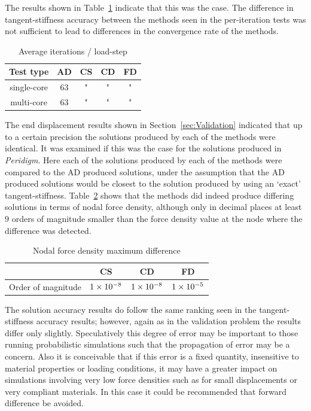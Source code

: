 \documentclass[preprint,12pt]{elsarticle}
\begin{document}
The results shown in Table~\ref{tab:ConvergenceStudy2} indicate that this was the case.  The difference in tangent-stiffness accuracy between the methods seen in the per-iteration tests was not sufficient to lead to differences in the convergence rate of the methods.
%
\begin{table}[htb]   
    \centering 
    \caption{Average iterations / load-step} 
    \label{tab:ConvergenceStudy2}   
    \begin{tabular}{c c c c c}
        \toprule 
        Test type & AD & CS & CD & FD\\
        \midrule 
        single-core & 63 & " & " & "\\ 
        multi-core  & 63 & " & " & "\\ 
        \bottomrule 
    \end{tabular} 
\end{table}

The end displacement results shown in Section~\ref{sec:Validation} indicated that up to a certain precision the solutions produced by each of the methods were identical. It was examined if this was the case for the solutions produced in \emph{Peridigm}. Here each of the solutions produced by each of the methods were compared to the AD produced solutions, under the assumption that the AD produced solutions would be closest to the solution produced by using an `exact' tangent-stiffness. Table~\ref{tab:PeridigmSolutionAccuracy} shows that the methods did indeed produce differing solutions in terms of nodal force density, although only in decimal places at least $9$ orders of magnitude smaller than the force density value at the node where the difference was detected.
%
\begin{table}[hbp]   
    \centering 
    \caption{Nodal force density maximum difference} 
    \label{tab:PeridigmSolutionAccuracy}   
    \begin{tabular}{c c c c}
        \toprule  & CS & CD & FD\\
        \midrule  Order of magnitude & $\num{1.E-8}$ & $\num{1.E-8}$ & $\num{1.E-5}$ \\ 
        \bottomrule 
    \end{tabular} 
\end{table}

The solution accuracy results do follow the same ranking seen in the tangent-stiffness accuracy results; however, again as in the validation problem the results differ only slightly. Speculatively this degree of error may be important to those running probabilistic simulations such that the propagation of error may be a concern. Also it is conceivable that if this error is a fixed quantity, insensitive to material properties or loading conditions, it may have a greater impact on simulations involving very low force densities such as for small displacements or very compliant materials. In this case it could be recommended that forward difference be avoided. 
%
\end{document}
